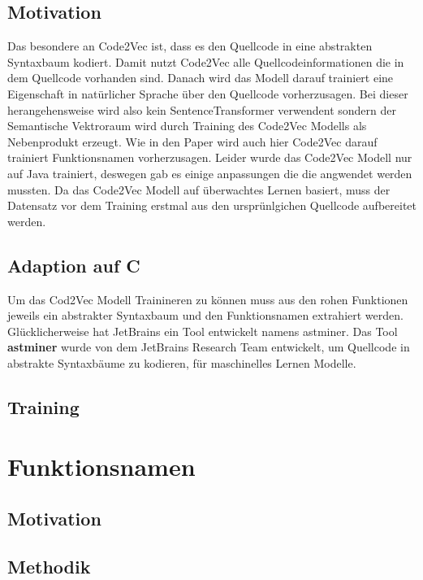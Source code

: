\documentclass[12pt,letterpaper,ngerman]{article}
\begin{document}
\subsection{Motivation} 
Das besondere an Code2Vec ist, dass es den Quellcode in eine abstrakten
Syntaxbaum kodiert. Damit nutzt Code2Vec alle Quellcodeinformationen die
in dem Quellcode vorhanden sind. Danach wird das Modell darauf trainiert
eine Eigenschaft in natürlicher Sprache über den Quellcode vorherzusagen.
Bei dieser herangehensweise wird also kein SentenceTransformer verwendent
sondern der Semantische Vektroraum wird durch Training des Code2Vec Modells
als Nebenprodukt erzeugt. Wie in den Paper wird auch hier Code2Vec
darauf trainiert Funktionsnamen vorherzusagen. Leider wurde das Code2Vec
Modell nur auf Java trainiert, deswegen gab es einige anpassungen die 
die angwendet werden mussten. Da das Code2Vec Modell
auf überwachtes Lernen basiert, muss der Datensatz vor dem Training
erstmal aus den ursprünlgichen Quellcode aufbereitet werden.
\subsection{Adaption auf C}
Um das Cod2Vec Modell Trainineren zu können muss aus den rohen Funktionen
jeweils ein abstrakter Syntaxbaum und den Funktionsnamen extrahiert werden.
Glücklicherweise hat JetBrains ein Tool entwickelt namens astminer. Das Tool
{\bf astminer}  wurde von dem JetBrains Research Team entwickelt, 
um Quellcode in abstrakte Syntaxbäume zu kodieren, für maschinelles Lernen
Modelle.



\subsection{Training}
\section{Funktionsnamen}
\subsection{Motivation}
\subsection{Methodik}
\end{document}
